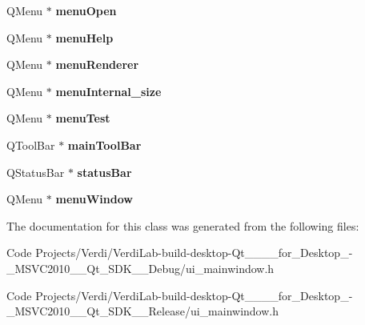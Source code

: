 \begin{DoxyCompactItemize}
\item 
\hypertarget{class_ui___main_window_a46bc79b96540fba99049c10ec25bf489}{\-Q\-Menu $\ast$ {\bfseries menu\-Open}}\label{class_ui___main_window_a46bc79b96540fba99049c10ec25bf489}

\item 
\hypertarget{class_ui___main_window_ad76e519fd6f4dbaf4e83f34c2f41f938}{\-Q\-Menu $\ast$ {\bfseries menu\-Help}}\label{class_ui___main_window_ad76e519fd6f4dbaf4e83f34c2f41f938}

\item 
\hypertarget{class_ui___main_window_a51d0c9ac6b8967219e45a38cf4ab38ab}{\-Q\-Menu $\ast$ {\bfseries menu\-Renderer}}\label{class_ui___main_window_a51d0c9ac6b8967219e45a38cf4ab38ab}

\item 
\hypertarget{class_ui___main_window_ae7ea3ff3bbd661650a420be33e7aff41}{\-Q\-Menu $\ast$ {\bfseries menu\-Internal\-\_\-size}}\label{class_ui___main_window_ae7ea3ff3bbd661650a420be33e7aff41}

\item 
\hypertarget{class_ui___main_window_a9ebd22129ca15e30d58546e000f9181e}{\-Q\-Menu $\ast$ {\bfseries menu\-Test}}\label{class_ui___main_window_a9ebd22129ca15e30d58546e000f9181e}

\item 
\hypertarget{class_ui___main_window_abca26371605d7c5235fab5188d4bdcf7}{\-Q\-Tool\-Bar $\ast$ {\bfseries main\-Tool\-Bar}}\label{class_ui___main_window_abca26371605d7c5235fab5188d4bdcf7}

\item 
\hypertarget{class_ui___main_window_afa919f3af6f2f526a70f1fa331f63724}{\-Q\-Status\-Bar $\ast$ {\bfseries status\-Bar}}\label{class_ui___main_window_afa919f3af6f2f526a70f1fa331f63724}

\item 
\hypertarget{class_ui___main_window_aa581778bd037edd4277987f699ff9d3d}{\-Q\-Menu $\ast$ {\bfseries menu\-Window}}\label{class_ui___main_window_aa581778bd037edd4277987f699ff9d3d}

\end{DoxyCompactItemize}


\-The documentation for this class was generated from the following files\-:\begin{DoxyCompactItemize}
\item 
\-Code Projects/\-Verdi/\-Verdi\-Lab-\/build-\/desktop-\/\-Qt\-\_\-\_\-\_\-\_\-for\-\_\-\-Desktop\-\_\--\/\-\_\-\-M\-S\-V\-C2010\-\_\-\-\_\-\-Qt\-\_\-\-S\-D\-K\-\_\-\-\_\-\-Debug/ui\-\_\-mainwindow.\-h\item 
\-Code Projects/\-Verdi/\-Verdi\-Lab-\/build-\/desktop-\/\-Qt\-\_\-\_\-\_\-\_\-for\-\_\-\-Desktop\-\_\--\/\-\_\-\-M\-S\-V\-C2010\-\_\-\-\_\-\-Qt\-\_\-\-S\-D\-K\-\_\-\-\_\-\-Release/ui\-\_\-mainwindow.\-h\end{DoxyCompactItemize}

